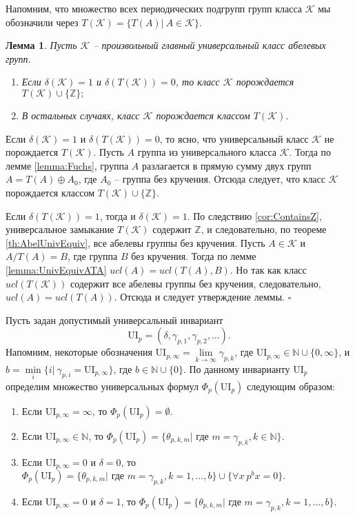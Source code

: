 \documentclass[a4paper,11pt,twoside]{article}
\newtheorem{lemma}{Лемма}[section]
\def\proof{{\noindent{\bf Доказательство.}} }
\def\K{{\mathcal{K}}}
\def\Z{{\mathbb{Z}}}
\def\N{{\mathbb{N}}}
\def\ui{{\mathrm{UI}}}
\begin{document}
Напомним, что множество всех периодических подгрупп групп класса $\K$ мы обозначили через $T(\K) = \{ T(A) | \ A \in \K\}.$

\begin{lemma}\label{lemma:ClassKGeneratedByTK}
Пусть $\K$ -- произвольный главный универсальный класс абелевых групп.
\begin{enumerate}
\item Если $\delta(\K) = 1$ и $\delta(T(\K)) = 0$, то класс $\K$ порождается $T(\K) \cup \{\Z\};$
\item В остальных случаях, класс $\K$ порождается классом $T(\K)$. 
\end{enumerate}
\end{lemma}

\proof Если $\delta(\K) = 1$ и $\delta(T(\K)) = 0$, то ясно, что универсальный класс $\K$ не порождается $T(\K)$. Пусть $A$ группа из универсального класса $\K$. Тогда по лемме \ref{lemma:Fuchs}, группа $A$ разлагается в прямую сумму двух групп $A = T(A) \oplus A_0$, где $A_0$ -- группа без кручения. Отсюда следует, что класс $\K$ порождается классом $T(\K) \cup \{\Z\}.$

Если $\delta(T(\K)) = 1$, тогда и $\delta(\K) = 1$. По следствию \ref{cor:ContainsZ}, универсальное замыкание $T(\K)$ содержит $\Z$, и следовательно, по теореме \ref{th:AbelUnivEquiv}, все абелевы группы без кручения. Пусть $A \in \K$ и $A \big/ T(A) = B$, где группа $B$ без кручения. Тогда по лемме \ref{lemma:UnivEquivATA} $ucl(A) = ucl(T(A), B).$ Но так как класс $ucl(T(\K))$ содержит все абелевы группы без кручения, следовательно, $ucl(A) = ucl(T(A))$. Отсюда и следует утверждение леммы. $\square$


Пусть задан допустимый универсальный инвариант 
$$\ui_p = (\delta, \gamma_{p,1}, \gamma_{p,2}, \ldots).$$ 
Напомним, некоторые обозначения $\ui_{p,\infty} = \lim\limits_{k \rightarrow \infty} \gamma_{p,k}$, где $\ui_{p,\infty} \in \N \cup \{0, \infty\}$, и $b = \min\limits_{i}\{i | \ \gamma_{p,i} = \ui_{p, \infty}\}$, где $b \in \N \cup \{0\}$. По данному инварианту $\ui_p$ определим множество универсальных формул $\Phi_p(\ui_p)$ следующим образом:
\begin{enumerate}
\item Если $\ui_{p,\infty} = \infty$, то $\Phi_p(\ui_p) = \emptyset.$
\item Если $\ui_{p, \infty} \in \N$, то $\Phi_p(\ui_p) = \{\theta_{p,k,m} | \text{ где } m = \gamma_{p,k}, k \in \N\}.$
\item Если $\ui_{p, \infty} = 0$ и $\delta = 0$, то $\Phi_p(\ui_p) = \{\theta_{p,k,m} | \text{ где } m = \gamma_{p,k}, k = 1,\ldots,b\} \cup \{\forall x \ p^b x = 0\}.$
\item Если $\ui_{p, \infty} = 0$ и $\delta = 1$, то $\Phi_p(\ui_p) = \{\theta_{p,k,m} | \text{ где } m = \gamma_{p,k}, k = 1, \ldots, b\}.$
\end{enumerate}
\end{document}
